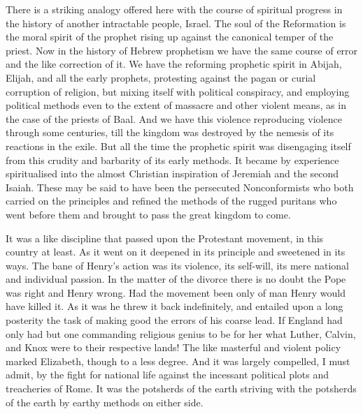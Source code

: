 \documentclass[12pt,a5paper,twoside]{book}
\begin{document}
There is a striking analogy offered here with the 
course of spiritual progress in the history of another 
intractable people, Israel. The soul of the Reformation 
is the moral spirit of the prophet rising up 
against the canonical temper of the priest. Now in 
the history of Hebrew prophetism we have the same 
course of error and the like correction of it. We 
have the reforming prophetic spirit in Abijah, Elijah, 
and all the early prophets, protesting against the pagan 
or curial corruption of religion, but mixing itself with 
political conspiracy, and employing political methods 
even to the extent of massacre and other violent 
means, as in the case of the priests of Baal. And we 
have this violence reproducing violence through some 
centuries, till the kingdom was destroyed by the 
nemesis of its reactions in the exile. But all the time 
the prophetic spirit was disengaging itself from this 
crudity and barbarity of its early methods. It became 
by experience spiritualised into the almost Christian 
inspiration of Jeremiah and the second Isaiah. These 
may be said to have been the persecuted Nonconformists 
who both carried on the principles and refined 
the methods of the rugged puritans who went before 
them and brought to pass the great kingdom to come. 

It was a like discipline that passed upon the Protestant 
movement, in this country at least. As it 
went on it deepened in its principle and sweetened in 
its ways. The bane of Henry's action was its violence, 
its self-will, its mere national and individual 
passion. In the matter of the divorce there is no 
doubt the Pope was right and Henry wrong. Had 
the movement been only of man Henry would have 
killed it. As it was he threw it back indefinitely, and 
entailed upon a long posterity the task of making good 
the errors of his coarse lead. If England had only 
had but one commanding religious genius to be for her 
what Luther, Calvin, and Knox were to their respective 
lands! The like masterful and violent policy 
marked Elizabeth, though to a less degree. And it 
was largely compelled, I must admit, by the fight for 
national life against the incessant political plots and 
treacheries of Rome. It was the potsherds of the 
earth striving with the potsherds of the earth by 
earthy methods on either side. 
\end{document}
